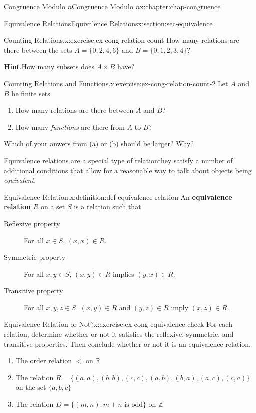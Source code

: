 \documentclass[oneside,10pt,]{book}
\newcommand{\blocktitlefont}{\relax}
\newcommand{\terminology}[1]{\textbf{#1}}
\numberwithin{equation}{section}
\newcommand{\lt}{<}
\begin{document}
\begin{chapterptx}{Congruence Modulo \(n\)}{}{Congruence Modulo \(n\)}{}{}{x:chapter:chap-congruence}
\begin{sectionptx}{Equivalence Relations}{}{Equivalence Relations}{}{}{x:section:sec-equivalence}
\begin{inlineexercise}{Counting Relations.}{x:exercise:ex-cong-relation-count}
How many relations are there between the sets \(A = \{0,2,4,6\}\) and \(B = \{0,1,2,3,4\}\)?%
\par\smallskip%
\noindent\textbf{\blocktitlefont Hint}.\hypertarget{g:hint:id323648}{}\quad{}How many subsets does \(A \times B\) have?%
\end{inlineexercise}
\begin{inlineexercise}{Counting Relations and Functions.}{x:exercise:ex-cong-relation-count-2}%
Let \(A\) and \(B\) be finite sets.%
\begin{enumerate}[label=(\alph*)]
\item{}How many relations are there between \(A\) and \(B\)?%
\item{}How many \emph{functions} are there from \(A\) to \(B\)?%
\end{enumerate}
Which of your anwers from (a) or (b) should be larger? Why?%
\end{inlineexercise}
Equivalence relations are a special type of relation\textemdash{}they satisfy a number of additional conditions that allow for a reasonable way to talk about objects being \emph{equivalent}.%
\begin{definition}{Equivalence Relation.}{x:definition:def-equivalence-relation}%
An \terminology{equivalence relation} \(R\) on a set \(S\) is a relation such that%
\begin{description}
\item[{Reflexive property}]For all \(x \in S\), \((x,x) \in R\).%
\item[{Symmetric property}]For all \(x, y \in S\), \((x,y) \in R\) implies \((y,x) \in R\).%
\item[{Transitive property}]For all \(x, y, z \in S\), \((x,y) \in R\) and \((y,z) \in R\) imply \((x,z) \in R\).%
\end{description}
%
\end{definition}
\begin{inlineexercise}{Equivalence Relation or Not?}{x:exercise:ex-cong-equivalence-check}%
For each relation, determine whether or not it satisfies the reflexive, symmetric, and transitive properties. Then conclude whether or not it is an equivalence relation.%
\begin{enumerate}[label=(\alph*)]
\item{}The order relation \(\lt\) on \(\mathbb{R}\)%
\item{}The relation \(R = \{(a,a),(b,b),(c,c),(a,b),(b,a),(a,c),(c,a)\}\) on the set \(\{a,b,c\}\)%
\item{}The relation \(D = \{(m,n): m + n \text{ is odd} \}\) on \(\mathbb{Z}\)%

\end{enumerate}
\end{inlineexercise}
\end{sectionptx}
\end{chapterptx}
\end{document}
